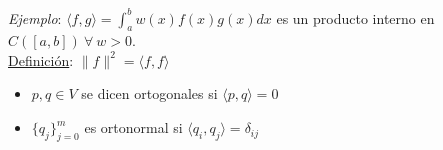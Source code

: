 \textit{Ejemplo}: $\langle f, g \rangle = \int_{a}^{b} w(x)f(x)g(x) dx$ es un producto interno en $C([a, b])\ \forall \ w > 0$.\\

\underline{Definici\'on}: $\|f\|^{2} = \langle f, f \rangle$

\begin{itemize}
	\item $p, q \in V$ se dicen ortogonales si $\langle p, q \rangle = 0$
	\item $\{q_{j}\}_{j = 0}^{m}$ es ortonormal si $\langle q_{i}, q_{j} \rangle = \delta_{ij}$
\end{itemize}